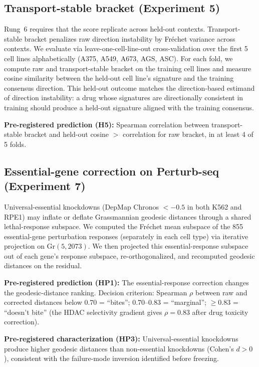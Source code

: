 \documentclass{article}
\begin{document}
\subsection{Transport-stable bracket (Experiment 5)}

Rung~6 requires that the score replicate across held-out contexts.
Transport-stable bracket penalizes raw direction instability by Fr\'{e}chet
variance across contexts. We evaluate via leave-one-cell-line-out
cross-validation over the first 5 cell lines alphabetically (A375, A549,
A673, AGS, ASC). For each fold, we compute raw and transport-stable bracket
on the training cell lines and measure cosine similarity between the
held-out cell line's signature and the training consensus direction. This
held-out outcome matches the direction-based estimand of direction
instability: a drug whose signatures are directionally consistent in
training should produce a held-out signature aligned with the training
consensus.

\textbf{Pre-registered prediction (H5):} Spearman correlation between
transport-stable bracket and held-out cosine $>$ correlation for raw bracket,
in at least 4 of 5 folds.

\subsection{Essential-gene correction on Perturb-seq (Experiment 7)}

Universal-essential knockdowns (DepMap Chronos $< -0.5$ in both K562 and
RPE1) may inflate or deflate Grassmannian geodesic distances through a
shared lethal-response subspace. We computed the Fr\'echet mean subspace of
the 855 essential-gene perturbation responses (separately in each cell type)
via iterative projection on Gr$(5, 2073)$. We then projected this
essential-response subspace out of each gene's response subspace,
re-orthogonalized, and recomputed geodesic distances on the residual.

\textbf{Pre-registered prediction (HP1):} The essential-response correction
changes the geodesic-distance ranking. Decision criterion: Spearman $\rho$
between raw and corrected distances below 0.70 = ``bites''; 0.70--0.83 =
``marginal''; $\geq 0.83$ = ``doesn't bite'' (the HDAC selectivity
gradient gives $\rho = 0.83$ after drug toxicity correction).

\textbf{Pre-registered characterization (HP3):} Universal-essential
knockdowns produce higher geodesic distances than non-essential knockdowns
(Cohen's $d > 0$), consistent with the failure-mode inversion identified
before freezing.
\end{document}

